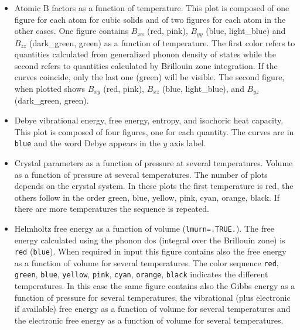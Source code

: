 \documentclass[12pt,a4paper,twoside]{report}
\begin{document}
\begin{itemize}
\item
Atomic B factors as a function of temperature. This plot is composed of 
one figure for each atom for cubic solids and of two figures for each atom
in the other cases. One figure contains $B_{xx}$ (red, pink), $B_{yy}$ 
(blue, light\_blue) and $B_{zz}$ (dark\_green, green) as a function of 
temperature. The first color refers to quantities calculated from 
generalized phonon density of states while the second refers to quantities 
calculated by Brillouin zone integration.
If the curves coincide, only the last one (green) will be visible. The second 
figure, when plotted shows $B_{xy}$ (red, pink), $B_{xz}$ (blue, light\_blue), 
and $B_{yz}$ (dark\_green, green).

\item
Debye vibrational energy, free energy, 
entropy, and isochoric heat capacity. This plot is composed of four 
figures, one for each quantity. The curves are in \texttt{blue}
and the word Debye appears in the $y$ axis label.

\item Crystal parameters as a function of pressure at several temperatures.
Volume as a function of pressure at several temperatures.
The number of plots depends on the crystal system.
In these plots the first temperature is red, the others follow in the 
order green, blue, yellow, pink, cyan, orange, black.
If there are more temperatures the sequence is 
repeated.

\item
Helmholtz free energy as a function of volume (\texttt{lmurn=.TRUE.}). 
The free energy calculated using the phonon dos (integral over
the Brillouin zone) is \texttt{red} (\texttt{blue}).
When required in input this figure contains also the
free energy as a function of volume for several temperatures.
The color sequence \texttt{red}, \texttt{green}, \texttt{blue},
\texttt{yellow}, \texttt{pink}, \texttt{cyan}, \texttt{orange},
\texttt{black} indicates the different temperatures.
In this case the same figure contains also the Gibbs energy as
a function of pressure for several temperatures,
the vibrational (plus electronic if available) free energy as a function 
of volume for several temperatures and the electronic free energy as 
a function of volume for several temperatures.


\end{itemize}
\end{document}
